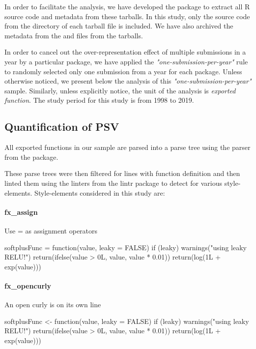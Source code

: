 In order to facilitate the analysis, we have developed the package  \citep{chan2} to extract all R source code and metadata from these tarballs. In this study, only the source code from the  directory of each tarball file is included. We have also archived the metadata from the  and  files from the tarballs.

In order to cancel out the over-representation effect of multiple submissions in a year by a particular package, we have applied the \emph{"one-submission-per-year"} rule to randomly selected only one submission from a year for each package. Unless otherwise noticed, we present below the analysis of this \emph{"one-submission-per-year"} sample. Similarly, unless explicitly notice, the unit of the analysis is \emph{exported function}. The study period for this study is from 1998 to 2019.

\subsection{Quantification of PSV}

All exported functions in our sample are parsed into a parse tree using the parser from the  \citep{lintr} package.

These parse trees were then filtered for lines with function definition and then linted them using the linters from the lintr package to detect for various style-elements. Style-elements considered in this study are:

\paragraph{fx\_assign}

Use = as assignment operators

\begin{example}
softplusFunc = function(value, leaky = FALSE) {
    if (leaky) {
        warnings("using leaky RELU!")
        return(ifelse(value > 0L, value, value * 0.01))
    }
    return(log(1L + exp(value)))
}
\end{example}

\paragraph{fx\_opencurly}

An open curly is on its own line

\begin{example}
softplusFunc <- function(value, leaky = FALSE) 
{
    if (leaky) 
    {
        warnings("using leaky RELU!")
        return(ifelse(value > 0L, value, value * 0.01))
    }
    return(log(1L + exp(value)))
}
\end{example}

